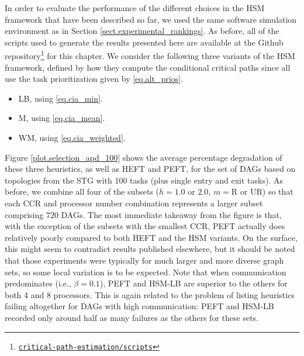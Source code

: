 \documentclass[12pt]{article}
\begin{document}
In order to evaluate the performance of the different choices in the HSM framework that have been described so far, we used the same software simulation environment as in Section \ref{sect.experimental_rankings}. As before, all of the scripts used to generate the results presented here are available at the Github repository\footnote{\href{https://github.com/mcsweeney90/critical-path-estimation}{{\tt \small critical-path-estimation/scripts}}} for this chapter. We consider the following three variants of the HSM framework, defined by how they compute the conditional critical paths since all use the task prioritization given by \eqref{eq.alt_prios}.
\begin{itemize}
	\item LB, using \eqref{eq.cia_min}.
	\item M, using \eqref{eq.cia_mean}.
	\item WM, using \eqref{eq.cia_weighted}.
\end{itemize}
Figure \ref{plot.selection_apd_100} shows the average percentage degradation of these three heuristics, as well as HEFT and PEFT, for the set of DAGs based on topologies from the STG with 100 tasks (plus single entry and exit tasks). As before, we combine all four of the subsets ($h = 1.0$ or $2.0$, $m = \text{R}$ or UR) so that each CCR and processor number combination represents a larger subset comprising $720$ DAGs. The most immediate takeaway from the figure is that, with the exception of the subsets with the smallest CCR, PEFT actually does relatively poorly compared to both HEFT and the HSM variants. On the surface, this might seem to contradict results published elsewhere, but it should be noted that those experiments were typically for much larger and more diverse graph sets, so some local variation is to be expected. Note that when communication predominates (i.e., $\beta = 0.1$), PEFT and HSM-LB are superior to the others for both 4 and 8 processors. This is again related to the problem of listing heuristics failing altogether for DAGs with high communication: PEFT and HSM-LB recorded only around half as many failures as the others for these sets.  
\end{document}
